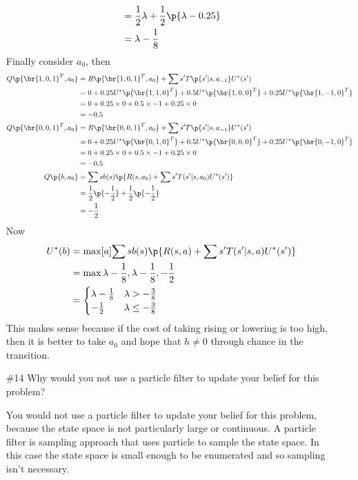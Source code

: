 \documentclass[12pt, oneside]{article}
\begin{document}
\begin{enumerate}
\begin{align*}
      &= \frac{1}{2}\lambda + \frac{1}{2}\p{\lambda - 0.25} \\
      &= \lambda - \frac{1}{8}
    \end{align*}
    Finally consider $a_0$, then
    \begin{align*}
      Q\p{\br{1, 0, 1}^T, a_{0}} &= R\p{\br{1, 0, 1}^T, a_{0}} + \sum{s'}{}{T\p{s'|s,a_{-1}}U^*(s')} \\
      &= 0 + 0.25U^*\p{\br{1, 1, 0}^T} + 0.5U^*\p{\br{1, 0, 0}^T} + 0.25U^*\p{\br{1, -1, 0}^T} \\
      &= 0 + 0.25\times 0 + 0.5\times -1 + 0.25\times 0 \\
      &= -0.5 \\
      Q\p{\br{0, 0, 1}^T, a_{0}} &= R\p{\br{0, 0, 1}^T, a_{0}} + \sum{s'}{}{T\p{s'|s,a_{-1}}U^*(s')} \\
      &= 0 + 0.25U^*\p{\br{0, 1, 0}^T} + 0.5U^*\p{\br{0, 0, 0}^T} + 0.25U^*\p{\br{0, -1, 0}^T} \\
      &= 0 + 0.25\times 0 + 0.5\times -1 + 0.25\times 0 \\
      &= -0.5 \\
      Q\p{b, a_{0}} &= \sum{s}{}{b(s)\p{R(s, a_0) + \sum{s'}{}{T(s'|s,a_0)U^*(s')}}} \\
      &= \frac{1}{2}\p{-\frac{1}{2}} + \frac{1}{2}\p{-\frac{1}{2}} \\
      &= -\frac{1}{2}
    \end{align*}
    Now 
    \begin{align*}
      U^*(b) &= \max[a]{\sum{s}{}{b(s)\p{R(s, a) + \sum{s'}{}{T(s'|s,a)U^*(s')}}}} \\
      &= \max{\lambda - \frac{1}{8}, \lambda - \frac{1}{8}, -\frac{1}{2}} \\
      &= \begin{cases}
        \lambda - \frac{1}{8} & \lambda > -\frac{3}{8} \\
        -\frac{1}{2} & \lambda \le -\frac{3}{8}
      \end{cases}
    \end{align*}
    This makes sense because if the cost of taking rising or lowering is too
    high, then it is better to take $a_0$ and hope that $h \neq 0$ through
    chance in the transition.

  \item[\#14] %
    Why would you not use a particle filter to update your belief for this
    problem?

    You would not use a particle filter to update your belief for this problem,
    because the state space is not particularly large or continuous.
    A particle filter is sampling approach that uses particle to sample the
    state space.
    In this case the state space is small enough to be enumerated and so
    sampling isn't necessary.


\end{enumerate}
\end{document}
